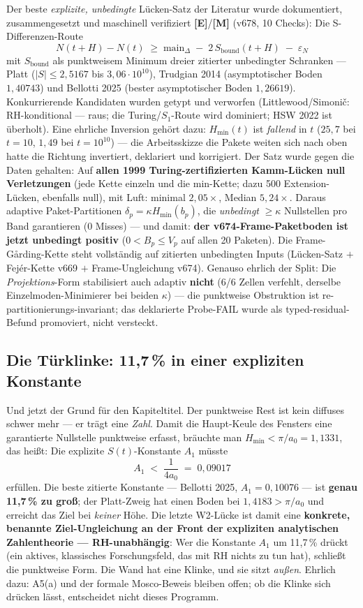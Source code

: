 \documentclass[11pt,a4paper]{article}
\newcommand{\E}{\textcolor{gut}{\textbf{[E]}}}
\newcommand{\M}{\textcolor{mess}{\textbf{[M]}}}
\begin{document}
Der beste \emph{explizite, unbedingte} Lücken-Satz der Literatur
wurde dokumentiert, zusammengesetzt und maschinell verifiziert
\E{}/\M{} (v678, 10 Checks): Die S-Differenzen-Route
\[
N(t + H) - N(t) \;\ge\; \mathrm{main}_\Delta \;-\; 2\,
S_{\mathrm{bound}}(t+H) \;-\; \varepsilon_N
\]
mit $S_{\mathrm{bound}}$ als punktweisem Minimum dreier zitierter
unbedingter Schranken --- Platt ($|S| \le 2{,}5167$ bis
$3{,}06 \cdot 10^{10}$), Trudgian 2014 (asymptotischer Boden
$1{,}40743$) und Bellotti 2025 (bester asymptotischer Boden
$1{,}26619$). Konkurrierende Kandidaten wurden getypt und
verworfen (Littlewood/Simoni\v{c}: RH-konditional --- raus; die
Turing/$S_1$-Route wird dominiert; HSW 2022 ist überholt). Eine
ehrliche Inversion gehört dazu: $H_{\min}(t)$ ist \emph{fallend}
in $t$ ($25{,}7$ bei $t = 10$, $1{,}49$ bei $t = 10^{10}$) --- die
Arbeitsskizze \glqq{}die Pakete weiten sich nach oben\grqq{} hatte
die Richtung invertiert, deklariert und korrigiert. Der Satz wurde
gegen die Daten gehalten: Auf \textbf{allen 1999
Turing-zertifizierten Kamm-Lücken null Verletzungen} (jede Kette
einzeln und die min-Kette; dazu 500 Extension-Lücken, ebenfalls
null), mit Luft: minimal $2{,}05\times$, Median $5{,}24\times$.
Daraus adaptive Paket-Partitionen $\delta_p = \kappa
H_{\min}(b_p)$, die \emph{unbedingt} $\ge \kappa$ Nullstellen pro
Band garantieren (0 Misses) --- und damit: \textbf{der
v674-Frame-Paketboden ist jetzt unbedingt positiv} ($0 < B_p \le
V_p$ auf allen 20 Paketen). Die Frame-Gårding-Kette steht
vollständig auf zitierten unbedingten Inputs (Lücken-Satz $+$
Fejér-Kette v669 $+$ Frame-Ungleichung v674). Genauso ehrlich der
Split: Die \emph{Projektions}-Form stabilisiert auch adaptiv
\textbf{nicht} (6/6 Zellen verfehlt, derselbe
Einzelmoden-Minimierer bei beiden $\kappa$) --- die punktweise
Obstruktion ist re-partitionierungs-invariant; das deklarierte
Probe-FAIL wurde als typed-residual-Befund promoviert, nicht
versteckt.

\subsection*{Die Türklinke: 11{,}7\,\% in einer expliziten
Konstante}

Und jetzt der Grund für den Kapiteltitel. Der punktweise Rest ist
kein diffuses \glqq{}schwer\grqq{} mehr --- er trägt eine
\emph{Zahl}. Damit die Haupt-Keule des Fensters eine garantierte
Nullstelle punktweise erfasst, bräuchte man $H_{\min} < \pi/a_0 =
1{,}1331$, das heißt: Die explizite $S(t)$-Konstante $A_1$ müsste
\[
A_1 \;<\; \frac{1}{4 a_0} \;=\; 0{,}09017
\]
erfüllen. Die beste zitierte Konstante --- Bellotti 2025,
$A_1 = 0{,}10076$ --- ist \textbf{genau 11{,}7\,\% zu groß}; der
Platt-Zweig hat einen Boden bei $1{,}4183 > \pi/a_0$ und erreicht
das Ziel bei \emph{keiner} Höhe. Die letzte W2-Lücke ist damit eine
\textbf{konkrete, benannte Ziel-Ungleichung an der Front der
expliziten analytischen Zahlentheorie --- RH-unabhängig}: Wer die
Konstante $A_1$ um 11{,}7\,\% drückt (ein aktives, klassisches
Forschungsfeld, das mit RH nichts zu tun hat), schließt die
punktweise Form. Die Wand hat eine Klinke, und sie sitzt
\emph{außen}. Ehrlich dazu: A5(a) und der formale Mosco-Beweis
bleiben offen; ob die Klinke sich drücken lässt, entscheidet nicht
dieses Programm.
\end{document}
